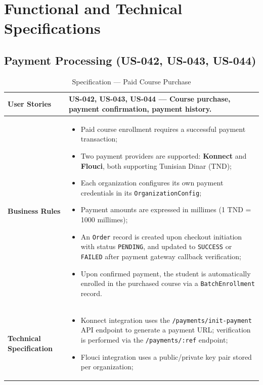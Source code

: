 \section{Functional and Technical Specifications}

\subsection{Payment Processing (US-042, US-043, US-044)}

\begin{table}[H]
\centering
\caption{Specification — Paid Course Purchase}
\label{tab:payment_spec}
\renewcommand{\arraystretch}{1.2}
\begin{tabularx}{\textwidth}{|p{3.5cm}|X|}
\hline
\textbf{User Stories} & US-042, US-043, US-044 — Course purchase, payment confirmation, payment history. \\
\hline
\textbf{Business Rules} &
\begin{itemize}[noitemsep, topsep=2pt]
  \item Paid course enrollment requires a successful payment transaction;
  \item Two payment providers are supported: \textbf{Konnect} and \textbf{Flouci},
        both supporting Tunisian Dinar (TND);
  \item Each organization configures its own payment credentials in its
        \texttt{OrganizationConfig};
  \item Payment amounts are expressed in millimes (1 TND = 1000 millimes);
  \item An \texttt{Order} record is created upon checkout initiation with status
        \texttt{PENDING}, and updated to \texttt{SUCCESS} or \texttt{FAILED} after
        payment gateway callback verification;
  \item Upon confirmed payment, the student is automatically enrolled in the purchased
        course via a \texttt{BatchEnrollment} record.
\end{itemize} \\
\hline
\textbf{Technical Specification} &
\begin{itemize}[noitemsep, topsep=2pt]
  \item Konnect integration uses the \texttt{/payments/init-payment} API endpoint to
        generate a payment URL; verification is performed via the
        \texttt{/payments/:ref} endpoint;
  \item Flouci integration uses a public/private key pair stored per organization;

\end{itemize}
\end{tabularx}
\end{table}
